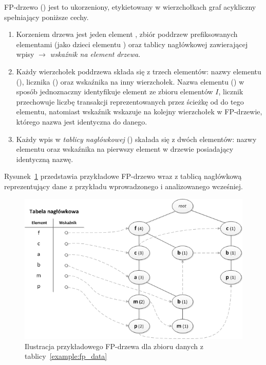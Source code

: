 \begin{df}\label{fptree:def}
FP-drzewo () jest to ukorzeniony, etykietowany w wierzchołkach graf acykliczny spełniający poniższe cechy.
\end{df}
\begin{enumerate}
	\item Korzeniem drzewa jest jeden element , zbiór poddrzew prefiksowanych elementami (jako dzieci elementu ) oraz tablicy nagłówkowej zawierającej wpisy  $\rightarrow$ \emph{wskaźnik na element drzewa}.
	\item Każdy wierzchołek poddrzewa składa się z trzech elementów: nazwy elementu (), licznika () oraz wskaźnika na inny wierzchołek. Nazwa elementu () w sposób jednoznaczny identyfikuje element ze zbioru elementów $I$, licznik przechowuje liczbę transakcji reprezentowanych przez ścieżkę od  do tego elementu, natomiast wskaźnik wskazuje na kolejny wierzchołek w FP-drzewie, którego nazwa jest identyczna do danego.
	\item Każdy wpis w \emph{tablicy nagłówkowej} () skałada się z dwóch elementów: nazwy elementu oraz wskaźnika na pierwszy element w drzewie posiadający identyczną nazwę.
\end{enumerate}

Rysunek~\ref{rys:fptree} przedstawia przykładowe FP-drzewo wraz z tablicą nagłówkową reprezentujący dane z przykładu wprowadzonego i analizowanego wcześniej.

\begin{figure}[h]
\centering\includegraphics{figures/02/fptree.png}
\caption{Ilustracja przykładowego FP-drzewa dla zbioru danych z tablicy~\ref{example:fp_data}}\label{rys:fptree}
\end{figure}

